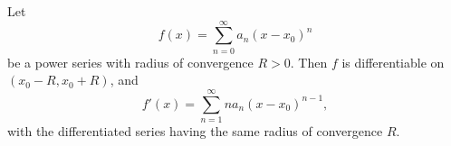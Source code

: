 Let
$$
f(x) = \sum_{n=0}^{\infty} a_n (x - x_0)^n
$$
be a power series with radius of convergence $R > 0$. Then $f$ is differentiable on $(x_0 - R, x_0 + R)$, and
$$
f'(x) = \sum_{n=1}^{\infty} n a_n (x - x_0)^{n-1},
$$
with the differentiated series having the same radius of convergence $R$.
